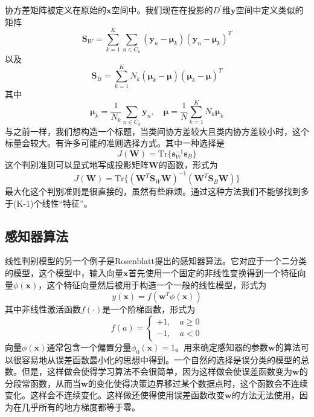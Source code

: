 协方差矩阵被定义在原始的$\boldsymbol{x}$空间中。我们现在在投影的$D^{'}$维$\boldsymbol{y}$空间中定义类似的矩阵
\begin{equation}
	\boldsymbol{S}_W=\sum_{k=1}^{K}\sum_{n\in C_k}(\boldsymbol{y}_n-\boldsymbol{\mu}_k)(\boldsymbol{y}_n-\boldsymbol{\mu}_k)^T
\end{equation}
以及
\begin{equation}
	\boldsymbol{S}_B=\sum_{k=1}^{K}N_k(\boldsymbol{\mu}_k-\boldsymbol{\mu})(\boldsymbol{\mu}_k-\boldsymbol{\mu})^T
\end{equation}
其中
\begin{equation}
	\boldsymbol{\mu}_k=\frac{1}{N_k}\sum_{n\in C_k}\boldsymbol{y}_n,\quad \boldsymbol{\mu}=\frac{1}{N}\sum_{k=1}^{K}N_k\boldsymbol{\mu}_k
\end{equation}
与之前一样，我们想构造一个标题，当类间协方差较大且类内协方差较小时，这个标量会较大。有许多可能的准则选择方式。其中一种选择是
\begin{equation}
	J(\boldsymbol{W})=\mathrm{Tr}\{\boldsymbol{s}_W^{-1}\boldsymbol{s}_B \}
\end{equation}
这个判别准则可以显式地写成投影矩阵$\boldsymbol{W}$的函数，形式为
\begin{equation}
	J(\boldsymbol{W})=\mathrm{Tr}\{(\boldsymbol{W}^T\boldsymbol{S}_W\boldsymbol{W})^{-1}(\boldsymbol{W}^T\boldsymbol{S}_B\boldsymbol{W}) \}
\end{equation}
最大化这个判别准则是很直接的，虽然有些麻烦。通过这种方法我们不能够找到多于(K-1)个线性“特征”。
\subsection*{感知器算法}
线性判别模型的另一个例子是Rosenblatt提出的感知器算法。它对应于一个二分类的模型，这个模型中，输入向量$\boldsymbol{x}$首先使用一个固定的非线性变换得到一个特征向量$\phi(\boldsymbol{x})$，这个特征向量然后被用于构造一个一般的线性模型，形式为
\begin{equation}
	y(\boldsymbol{x})=f(\boldsymbol{w}^T\phi(\boldsymbol{x}))
\end{equation}
其中非线性激活函数$f(\cdot)$是一个阶梯函数，形式为
\begin{equation}
	f(a)=\begin{cases}
		+1,\quad a\geqslant 0\\
		-1,\quad a<0
	\end{cases}
\end{equation}
向量$\phi(\boldsymbol{x})$通常包含一个偏置分量$\phi_0(\boldsymbol{x})=1$。用来确定感知器的参数$\boldsymbol{w}$的算法可以很容易地从误差函数最小化的思想中得到。一个自然的选择是误分类的模型的总数。但是，这样做会使得学习算法不会很简单，因为这样做会使误差函数变为$\boldsymbol{w}$的分段常函数，从而当$\boldsymbol{w}$的变化使得决策边界移过某个数据点时，这个函数会不连续变化。这样会不连续变化。这样做还使得使用误差函数改变$\boldsymbol{w}$的方法无法使用，因为在几乎所有的地方梯度都等于零。


